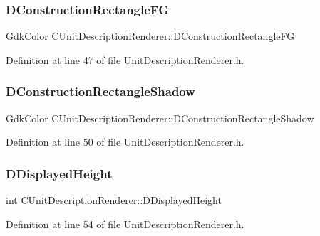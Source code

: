 \subsubsection{\texorpdfstring{D\+Construction\+Rectangle\+FG}{DConstructionRectangleFG}}
{\footnotesize\ttfamily Gdk\+Color C\+Unit\+Description\+Renderer\+::\+D\+Construction\+Rectangle\+FG\hspace{0.3cm}{\ttfamily [protected]}}



Definition at line 47 of file Unit\+Description\+Renderer.\+h.

\hypertarget{classCUnitDescriptionRenderer_a8e19ce3520d89f775dc5de84c2985221}{}\label{classCUnitDescriptionRenderer_a8e19ce3520d89f775dc5de84c2985221} 
\subsubsection{\texorpdfstring{D\+Construction\+Rectangle\+Shadow}{DConstructionRectangleShadow}}
{\footnotesize\ttfamily Gdk\+Color C\+Unit\+Description\+Renderer\+::\+D\+Construction\+Rectangle\+Shadow\hspace{0.3cm}{\ttfamily [protected]}}



Definition at line 50 of file Unit\+Description\+Renderer.\+h.

\hypertarget{classCUnitDescriptionRenderer_acc5f08d377a050f778614561a0b12a6c}{}\label{classCUnitDescriptionRenderer_acc5f08d377a050f778614561a0b12a6c} 
\subsubsection{\texorpdfstring{D\+Displayed\+Height}{DDisplayedHeight}}
{\footnotesize\ttfamily int C\+Unit\+Description\+Renderer\+::\+D\+Displayed\+Height\hspace{0.3cm}{\ttfamily [protected]}}



Definition at line 54 of file Unit\+Description\+Renderer.\+h.

